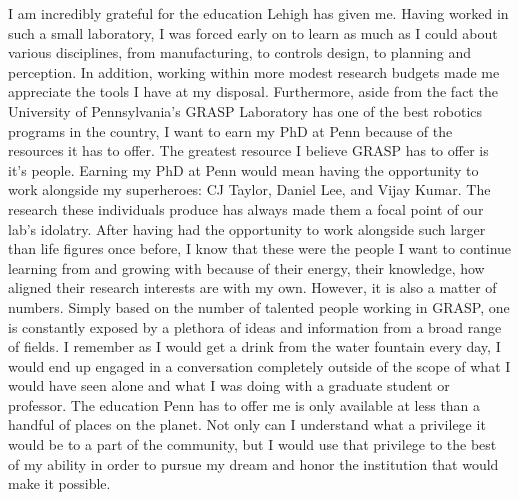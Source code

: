 \documentclass{article}
\begin{document}
I am incredibly grateful for the education Lehigh has given me. Having worked
in such a small laboratory, I was forced early on to learn as much as I could
about various disciplines, from manufacturing, to controls design, to planning
and perception. In addition, working within more modest research budgets made
me appreciate the tools I have at my disposal. Furthermore, aside from the fact
the University of Pennsylvania’s GRASP Laboratory has one of the best robotics
programs in the country, I want to earn my PhD at Penn because of the resources
it has to offer. The greatest resource I believe GRASP has to offer is it's
people.  Earning my PhD at Penn would mean having the opportunity to work
alongside my superheroes: CJ Taylor, Daniel Lee, and Vijay Kumar. The research
these individuals produce has always made them a focal point of our lab's
idolatry. After having had the opportunity to work alongside such larger than
life figures once before, I know that these were the people I want to continue
learning from and growing with because of their energy, their knowledge, how
aligned their research interests are with my own.  However, it is also a matter
of numbers. Simply based on the number of talented people working in GRASP, one
is constantly exposed by a plethora of ideas and information from a broad range
of fields.  I remember as I would get a drink from the water fountain every
day, I would end up engaged in a conversation completely outside of the scope
of what I would have seen alone and what I was doing with a graduate student or
professor. The education Penn has to offer me is only available at less than a
handful of places on the planet. Not only can I understand what a privilege it
would be to a part of the community, but I would use that privilege to the best
of my ability in order to pursue my dream and honor the institution that would
make it possible.
\end{document}
